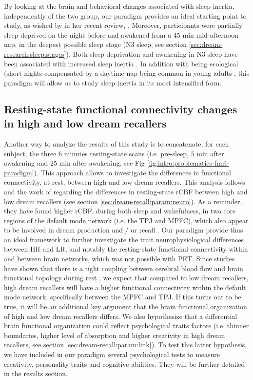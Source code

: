By looking at the brain and behavioral changes associated with sleep inertia, independently of the two group, our paradigm provides an ideal starting point to study, as wished by \citet{trotti_waking_2016} in her recent review, . Moreover, participants were partially sleep deprived on the night before and awakened from a 45 min mid-afternoon nap, in the deepest possible sleep stage (N3 sleep; see section \ref{sec:dream-research:sleep:stages}). Both sleep deprivation and awakening in N3 sleep have been associated with increased sleep inertia \citep{tassi_sleep_2000}. In addition with being ecological (short nights compensated by a daytime nap being common in young adults \citep{faraut_napping:_2016}, this paradigm will allow us to study sleep inertia in its most intensified form.

\subsection{Resting-state functional connectivity changes in high and low dream recallers}
\label{sec:problematic:inertia:resting-drf}

Another way to analyze the results of this study is to concatenate, for each subject, the three 6 minutes resting-state scans (i.e. pre-sleep, 5 min after awakening and 25 min after awakening, see Fig \ref{fig:intro:problematics-fmri-paradigm}). This approach allows to investigate the differences in functional connectivity, at rest, between high and low dream recallers. This analysis follows and the work of \citet{eichenlaub_resting_2014} regarding the differences in resting-state rCBF between high and low dream recallers (see section \ref{sec:dream-recall:param:neuro}). As a reminder, they have found higher rCBF, during both sleep and wakefulness, in two core regions of the default mode network (i.e. the TPJ and MPFC), which also appear to be involved in dream production and / or recall \citep{solms_neuropsychology_1997}. Our paradigm provide thus an ideal framework to further investigate the trait neurophysiological differences between HR and LR, and notably the resting-state functional connectivity within and between brain networks, which was not possible with PET. Since studies have shown that there is a tight coupling between cerebral blood flow and brain functional topology during rest \citep{liang_coupling_2013}, we expect that compared to low dream recallers, high dream recallers will have a higher functional connectivity within the default mode network, specifically between the MPFC and TPJ. If this turns out to be true, it will be an additional key argument that the brain functional organization of high and low dream recallers differs. We also hypothesize that a differential brain functional organization could reflect psychological traits factors (i.e. thinner boundaries, higher level of absorption and higher creativity in high dream recallers, see section \ref{sec:dream-recall:param:link}). To test this latter hypothesis, we have included in our paradigm several psychological tests to measure creativity, personality traits and cognitive abilities. They will be further detailed in the results section.

